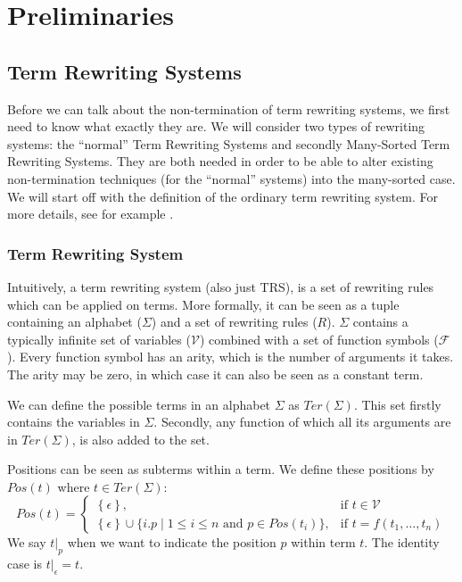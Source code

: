 \chapter{Preliminaries}\label{preliminaries}
\section{Term Rewriting Systems}
Before we can talk about the non-termination of term rewriting systems, we first need to know what exactly they are. We will consider two types of rewriting systems: the ``normal'' Term Rewriting Systems and secondly Many-Sorted Term Rewriting Systems. They are both needed in order to be able to alter existing non-termination techniques (for the ``normal'' systems) into the many-sorted case. We will start off with the definition of the ordinary term rewriting system. For more details, see for example \cite{Klop:1993:TRS:162552.162559}.
\subsection{Term Rewriting System}
Intuitively, a term rewriting system (also just TRS), is a set of rewriting rules which can be applied on terms. More formally, it can be seen as a tuple containing an alphabet ($\Sigma$) and a set of rewriting rules ($R$). $\Sigma$ contains a typically infinite set of variables ($\mathcal{V}$) combined with a set of function symbols ($\mathcal{F}$). Every function symbol has an arity, which is the number of arguments it takes. The arity may be zero, in which case it can also be seen as a constant term.  

We can define the possible terms in an alphabet $\Sigma$ as $\textit{Ter}\left(\Sigma\right)$. This set firstly contains the variables in $\Sigma$. Secondly, any function of which all its arguments are in $\textit{Ter}\left(\Sigma\right)$, is also added to the set.

Positions can be seen as subterms within a term. We define these positions by $\textit{Pos}\left(t\right)$ where $t \in \textit{Ter}\left(\Sigma\right)$:
$$
\textit{Pos}(t) = \left\{\begin{array}{ll}
        \left\{\epsilon\right\}, & \text{if } t \in \mathcal{V}\\
        \left\{\epsilon\right\} \cup \{i.p \mid 1 \leq i \leq n \text{ and } p  \in \textit{Pos}(t_i)\} , & \text{if } t = f(t_1, \dots, t_n)
        \end{array}\right.
$$
We say $\left.t\right|_p$ when we want to indicate the position $p$ within term $t$. The identity case is $\left.t\right|_\epsilon = t$.

